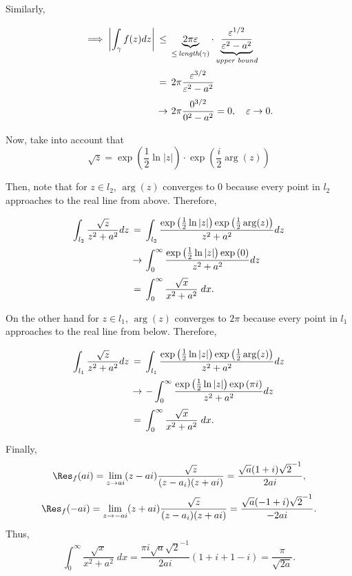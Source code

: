 Similarly,
\[ \everymath{\displaystyle}
\arraycolsep=1.8pt\def\arraystretch{2.5}
\begin{array}{rcl}
    \implies \left| \int_{\gamma} f(z) dz \right| & \leq & \underbrace{2\pi \varepsilon}_{\leq\,\textit{length}(\gamma)} \cdot \underbrace{\frac{\varepsilon^{1/2}}{\varepsilon^2 - a^2}}_{\textit{upper bound}}\\
    & = & 2\pi \frac{\varepsilon^{3/2}}{\varepsilon^2 - a^2 }\\
    & \to & 2\pi \frac{0^{3/2}}{0^2 - a^2} = 0,\hspace{1em} \varepsilon\to 0.
\end{array} \]

Now, take into account that
\[ \sqrt{z} = \exp\left( \frac{1}{2}\ln|z|\right)\cdot \exp\left( \frac{i}{2}\arg(z) \right) \]

Then, note that for $z \in l_2$, $\arg(z)$ converges to 0 because every point in $l_2$ approaches to the real line from above. Therefore,
\[ \everymath{\displaystyle}
\arraycolsep=1.8pt\def\arraystretch{2.5}
\begin{array}{rcl}
    \int_{l_2} \frac{\sqrt{z}}{z^2 + a^2} dz & = & \int_{l_2} \frac{\exp\left( \frac{1}{2} \ln|z| \right)\exp\left( \frac{1}{2} \arg(z)\right)}{z^2 + a^2} dz\\
    & \to & \int_{0}^{\infty} \frac{\exp\left( \frac{1}{2} \ln|z| \right)\exp\left( 0\right)}{z^2 + a^2} dz\\
    & = & \int_{0}^{\infty}{\frac{\sqrt{x}}{x^{2}+a^{2}}}\; d x.
\end{array} \]

On the other hand for $z \in l_1$, $\arg(z)$ converges to $2\pi$ because every point in $l_1$ approaches to the real line from below. Therefore,
\[ \everymath{\displaystyle}
\arraycolsep=1.8pt\def\arraystretch{2.5}
\begin{array}{rcl}
    \int_{l_1} \frac{\sqrt{z}}{z^2 + a^2} dz & = & \int_{l_1} \frac{\exp\left( \frac{1}{2} \ln|z| \right)\exp\left( \frac{1}{2} \arg(z)\right)}{z^2 + a^2} dz\\
    & \to & -\int_{0}^{\infty} \frac{\exp\left( \frac{1}{2} \ln|z| \right)\exp\left( \pi i\right)}{z^2 + a^2} dz\\
    & = & \int_{0}^{\infty}{\frac{\sqrt{x}}{x^{2}+a^{2}}}\; d x.
\end{array} \]

Finally,
\[ \Res_f(ai) = \lim_{z\to ai} (z-ai)\frac{\sqrt{z}}{(z-a_i)(z+ai)} = \frac{\sqrt{a}(1+i)\sqrt{2}^{-1}}{2ai},\]
\[ \Res_f(-ai) = \lim_{z\to -ai} (z+ai)\frac{\sqrt{z}}{(z-a_i)(z+ai)} = \frac{\sqrt{a}(-1+i)\sqrt{2}^{-1}}{-2ai}.\]
Thus,
\[ \int_{0}^{\infty}{\frac{\sqrt{x}}{x^{2}+a^{2}}}\; d x = \frac{\pi  i \sqrt{a} \sqrt{2}^{-1}}{2ai}(1+i+1-i) =  \frac{\pi}{\sqrt{2a}}.\]

